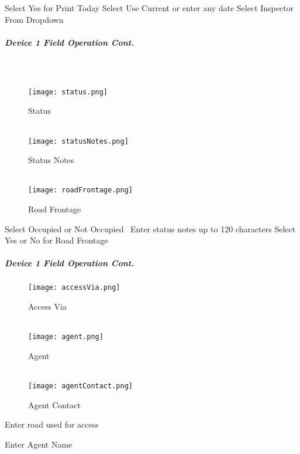 \documentclass[class=article , crop=false, titlepage, twoside, multi={itemize, figure, verbatim}, float=false]{standalone}
\begin{document}
Select Yes for Print Today
\vspace{2.5in}
\noindent Select Use Current or enter any date
\vspace{2in}
\noindent Select Inspector From Dropdown
\clearpage
\subparagraph*{Device 1 Field Operation Cont.}
\subparagraph*{\\}
\begin{wrapfigure}{r}{0.5\textwidth}
\centering
\texttt{[image: status.png]}
\caption {Status}
\vspace{.2in}
\HRule \\[.4cm] %
\vspace{.2in}
\texttt{[image: statusNotes.png]}
\caption{Status Notes}
\vspace{.2in}
\HRule \\[.4cm] %
\vspace{.2in}
\texttt{[image: roadFrontage.png]}
\caption{Road Frontage}
\end{wrapfigure}
Select Occupied or Not Occupied\
\vspace{2in}
\noindent Enter status notes up to 120 characters
\vspace{2in}
\noindent Select Yes or No for Road Frontage
\clearpage
\subparagraph*{Device 1 Field Operation Cont.}
\begin{wrapfigure}{r}{0.5\textwidth}
\centering
\texttt{[image: accessVia.png]}
\caption {Access Via}
\vspace{.2in}
\HRule \\[.4cm] %
\vspace{.2in}
\texttt{[image: agent.png]}
\caption{Agent}
\vspace{.2in}
\HRule \\[.4cm] %
\vspace{.2in}
\texttt{[image: agentContact.png]}
\caption{Agent Contact}
\end{wrapfigure}
Enter road used for access
\vspace{2in}

\noindent Enter Agent Name
\vspace{2in}
\end{document}
